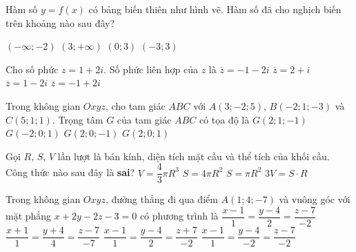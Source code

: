 \begin{ex}%
	Hàm số $y=f(x)$ có bảng biến thiên như hình vẽ. Hàm số đã cho nghịch biến trên khoảng nào sau đây?
	\begin{center}
	\end{center}
	\choice
	{$(-\infty;-2)$}
	{$(3;+\infty)$}
	{\True $(0;3)$}
	{$(-3;3)$}
\end{ex}

\begin{ex}%
	Cho số phức $z=1+2i$. Số phức liên hợp của $z$ là
	\choice
	{$\overline{z}=-1-2i$}
	{$\overline{z}=2+i$}
	{\True $\overline{z}=1-2i$}
	{$\overline{z}=-1+2i$}
\end{ex}

\begin{ex}%
	Trong không gian $Oxyz$, cho tam giác $ABC$ với $A(3;-2;5)$, $B(-2;1;-3)$ và $C(5;1;1)$. Trọng tâm $G$ của tam giác $ABC$ có tọa độ là
	\choice
	{$G(2;1;-1)$}
	{$G(-2;0;1)$}
	{$G(2;0;-1)$}
	{\True $G(2;0;1)$}
\end{ex}

\begin{ex}%
	Gọi $R,\,S,\,V$ lần lượt là bán kính, diện tích mặt cầu và thể tích của khối cầu. Công thức nào sau đây là \textbf{sai}?
	\choice
	{$V=\dfrac{4}{3}\pi R^3$}
	{$S=4\pi R^2$}
	{\True $S=\pi R^2$}
	{$3V=S\cdot R$}
	\loigiai{
		
	} 
\end{ex}

\begin{ex}%
	Trong không gian $Oxyz$, đường thẳng đi qua điểm $A(1;4;-7)$ và vuông góc với mặt phẳng $x+2y-2z-3=0$ có phương trình là
	\choice
	{$\dfrac{x-1}{1}=\dfrac{y-4}{2}=\dfrac{z-7}{-2}$}
	{$\dfrac{x+1}{1}=\dfrac{y+4}{4}=\dfrac{z-7}{-7}$}
	{\True $\dfrac{x-1}{1}=\dfrac{y-4}{2}=\dfrac{z+7}{-2}$}
	{$\dfrac{x-1}{1}=\dfrac{y-4}{-2}=\dfrac{z-7}{-2}$}
\end{ex}


